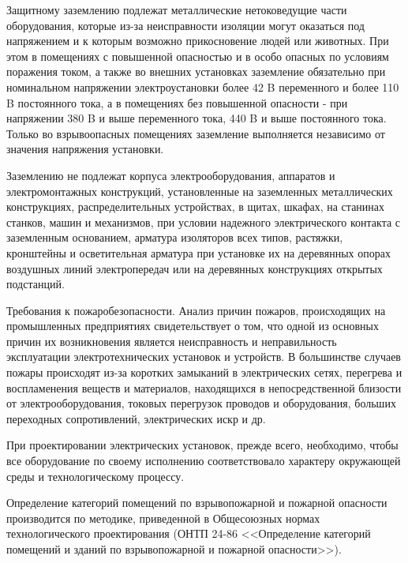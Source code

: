         Защитному заземлению подлежат металлические нетоковедущие части
        оборудования, которые из-за неисправности изоляции могут оказаться под
        напряжением и к которым возможно прикосновение людей или животных. При
        этом в помещениях с повышенной опасностью и в особо опасных по условиям
        поражения током, а также во внешних установках заземление обязательно
        при номинальном напряжении электроустановки более 42 B переменного и
        более 110 B постоянного тока, а в помещениях без повышенной опасности -
        при напряжении 380 B и выше переменного тока, 440 B и выше постоянного
        тока. Только во взрывоопасных помещениях заземление выполняется
        независимо от значения напряжения установки.

        Заземлению не подлежат корпуса электрооборудования, аппаратов и
        электромонтажных конструкций, установленные на заземленных
        металлических конструкциях, распределительных устройствах, в щитах,
        шкафах, на станинах станков, машин и механизмов, при условии надежного
        электрического контакта с заземленным основанием, арматура изоляторов
        всех типов, растяжки, кронштейны и осветительная арматура при установке
        их на деревянных опорах воздушных линий электропередач или на
        деревянных конструкциях открытых подстанций.

        Требования к пожаробезопасности.
        Анализ причин пожаров, происходящих на промышленных предприятиях
        свидетельствует о том, что одной из основных причин их возникновения
        является неисправность и неправильность эксплуатации электротехнических
        установок и устройств. В большинстве случаев пожары происходят из-за
        коротких замыканий в электрических сетях, перегрева и воспламенения
        веществ и материалов, находящихся в непосредственной близости от
        электрооборудования, токовых перегрузок проводов и оборудования,
        больших переходных сопротивлений, электрических искр и др.

        При проектировании электрических установок, прежде всего, необходимо,
        чтобы все оборудование по своему исполнению соответствовало характеру
        окружающей среды и технологическому процессу.

        Определение категорий помещений по взрывопожарной и пожарной опасности
        производится по методике, приведенной в Общесоюзных нормах
        технологического проектирования (ОНТП 24-86 <<Определение категорий
        помещений и зданий по взрывопожарной и пожарной опасности>>).

